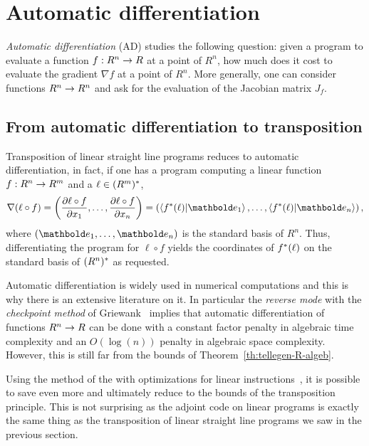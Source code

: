 

\section{Automatic differentiation}
\label{sec:autom-diff}

\emph{Automatic differentiation}
(AD) studies the following
question: given a program to evaluate a function $f:R^n\rightarrow R$ at a
point of $R^n$, how much does it cost to evaluate the gradient $\nabla
f$ at a point of $R^n$. More generally, one can consider functions
$R^n\rightarrow R^n$ and ask for the evaluation of the Jacobian matrix $J_f$.

\subsection{From automatic differentiation to transposition}
\label{sec:from-autom-diff}
Transposition of linear straight line programs reduces to automatic
differentiation, in fact, if one has a program computing a linear
function $f:R^n\rightarrow R^m$ and a $\ell\in(R^m)^\ast$,
\begin{equation}
  \label{eq:261}
  \nabla (\ell\circ f) =
  \left(\frac{\partial \ell\circ f}{\partial x_1},\ldots,\frac{\partial \ell\circ f}{\partial x_n}\right) =
  \left(\braket{\dual{f}(\ell)}{\basis{e}_1},\ldots,\braket{\dual{f}(\ell)}{\basis{e}_n}\right)
  \text{,}
\end{equation}
where $(\basis{e}_1,\ldots,\basis{e}_n)$ is the standard basis of
$R^n$. Thus, differentiating the program for $\ell\circ f$ yields the
coordinates of $f^\ast(\ell)$ on the standard basis of
$(R^n)^\ast$ as requested.

Automatic differentiation is widely used in numerical computations and
this is why there is an extensive literature on it. In particular the
\emph{reverse
  mode} with the
\emph{checkpoint
  method} of Griewank~\cite{griewank92} implies that automatic
differentiation of functions $R^n\rightarrow R$ can be done with a constant
factor penalty in algebraic time complexity and an $O(\log(n))$
penalty in algebraic space complexity. However, this is still far from
the bounds of Theorem~\ref{th:tellegen-R-algeb}.

Using the method of the
 with optimizations for linear
instructions~\cite{gilbert+levey+masse91}, it is possible to save even
more and ultimately reduce to the bounds of the transposition
principle. This is not surprising as the adjoint code on linear
programs is exactly the same thing as the transposition of linear
straight line programs we saw in the previous section.

